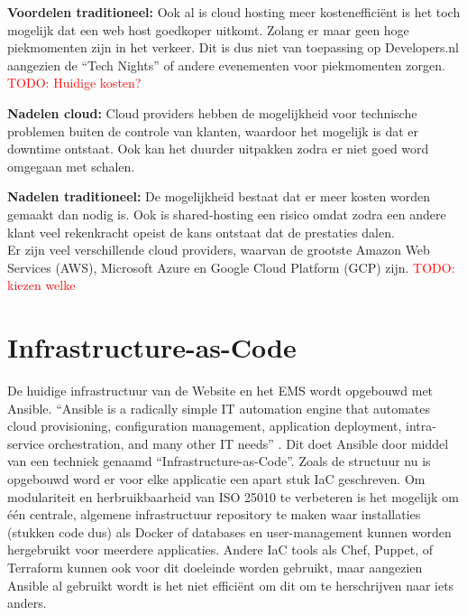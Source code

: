 \textbf{Voordelen traditioneel:} Ook al is cloud hosting meer kostenefficiënt is het toch mogelijk dat een web host goedkoper uitkomt. Zolang er maar geen hoge piekmomenten zijn in het verkeer. Dit is dus niet van toepassing op Developers.nl aangezien de \enquote{Tech Nights} of andere evenementen voor piekmomenten zorgen. \textcolor{red}{TODO: Huidige kosten?} %

\textbf{Nadelen cloud:} Cloud providers hebben de mogelijkheid voor technische problemen buiten de controle van klanten, waardoor het mogelijk is dat er downtime ontstaat. Ook kan het duurder uitpakken zodra er niet goed word omgegaan met schalen.

\textbf{Nadelen traditioneel:} De mogelijkheid bestaat dat er meer kosten worden gemaakt dan nodig is. Ook is shared-hosting een risico omdat zodra een andere klant veel rekenkracht opeist de kans ontstaat dat de prestaties dalen.\\

Er zijn veel verschillende cloud providers, waarvan de grootste Amazon Web Services (AWS), Microsoft Azure en Google Cloud Platform (GCP) zijn. \textcolor{red}{TODO: kiezen welke} %

\section{Infrastructure-as-Code}
De huidige infrastructuur van de Website en het EMS wordt opgebouwd met Ansible. \enquote{Ansible is a radically simple IT automation engine that automates cloud provisioning, configuration management, application deployment, intra-service orchestration, and many other IT needs} \parencite{Ansible}. Dit doet Ansible door middel van een techniek genaamd \enquote{Infrastructure-as-Code}. Zoals de structuur nu is opgebouwd word er voor elke applicatie een apart stuk IaC geschreven. Om modulariteit en herbruikbaarheid van ISO 25010 \parencite{ISO25010} te verbeteren is het mogelijk om één centrale, algemene infrastructuur repository te maken waar installaties (stukken code dus) als Docker of databases en user-management kunnen worden hergebruikt voor meerdere applicaties. Andere IaC tools als Chef, Puppet, of Terraform kunnen ook voor dit doeleinde worden gebruikt, maar aangezien Ansible al gebruikt wordt is het niet efficiënt om dit om te herschrijven naar iets anders.

